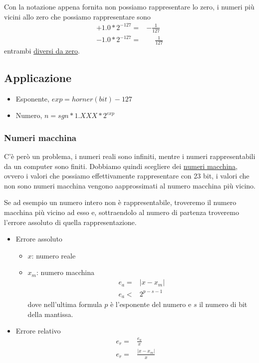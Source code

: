 \documentclass[../main.tex]{subfiles}
\begin{document}
\vspace{0.5cm}
Con la notazione appena fornita non possiamo rappresentare lo zero, i numeri più vicini allo zero che possiamo rappresentare sono
\begin{align*}
    + 1.0 * 2^{-127} =& -\frac{1}{127}\\
    - 1.0 * 2^{-127} =& \phantom{-}\frac{1}{127} 
\end{align*}
entrambi \underline{diversi da zero}.

\vspace{0.5cm}
\subsection{Applicazione}
\begin{itemize}
    \item Esponente, $exp = horner(bit) -127$
    \item Numero, $n = sgn * 1.XXX * 2^{exp}$
\end{itemize}

\subsubsection{Numeri macchina}
C'è però un problema, i numeri reali sono infiniti, mentre i numeri rappresentabili da un computer sono finiti. Dobbiamo quindi scegliere
dei \underline{numeri macchina}, ovvero i valori che possiamo effettivamente rappresentare con 23 bit, i valori che non sono numeri macchina vengono 
aapprossimati al numero macchina più vicino. 

Se ad esempio un numero intero non è rappresentabile, troveremo il numero macchina più vicino ad esso e, sottraendolo al numero di partenza
troveremo l'errore assoluto di quella rappresentazione.
\begin{itemize}
    \item Errore assoluto
    \begin{itemize}
        \item $x$: numero reale
        \item $x_m$: numero macchina \begin{align*}
            e_a =& \left\lvert x - x_m\right\rvert  \\
            e_a <& 2^{p-s-1}
        \end{align*}
        dove nell'ultima formula $p$ è l'esponente del numero e $s$ il numero di bit della mantissa.
    \end{itemize}
    \item Errore relativo \begin{align*}
        e_r =& \frac{e_a}{x} \\
        e_r =& \frac{\left\lvert x - x_m\right\rvert}{x}
    \end{align*}
\end{itemize}
\end{document}
